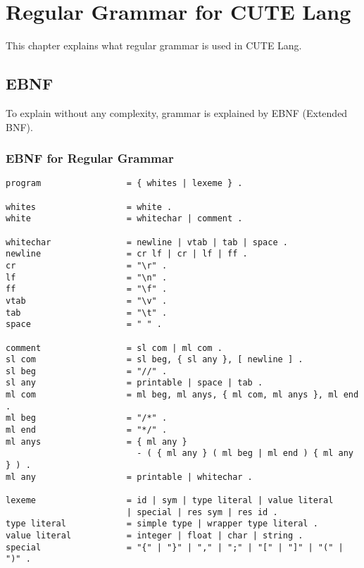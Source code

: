 \documentclass[a4paper, article, oneside, 10pt]{memoir}
\begin{document}
\pagestyle{ruled}
\chapter{Regular Grammar for CUTE Lang}
This chapter explains what regular grammar is used in CUTE Lang.

\section{EBNF}
To explain without any complexity, grammar is explained by EBNF (Extended BNF).

\subsection{EBNF for Regular Grammar}

\begin{verbatim}
program                 = { whites | lexeme } .

whites                  = white .
white                   = whitechar | comment .

whitechar               = newline | vtab | tab | space .
newline                 = cr lf | cr | lf | ff .
cr                      = "\r" .
lf                      = "\n" .
ff                      = "\f" .
vtab                    = "\v" .
tab                     = "\t" .
space                   = " " .

comment                 = sl com | ml com .
sl com                  = sl beg, { sl any }, [ newline ] .
sl beg                  = "//" .
sl any                  = printable | space | tab .
ml com                  = ml beg, ml anys, { ml com, ml anys }, ml end .
ml beg                  = "/*" .
ml end                  = "*/" .
ml anys                 = { ml any }
                          - ( { ml any } ( ml beg | ml end ) { ml any } ) .
ml any                  = printable | whitechar .

lexeme                  = id | sym | type literal | value literal
                        | special | res sym | res id .
type literal            = simple type | wrapper type literal .
value literal           = integer | float | char | string .
special                 = "{" | "}" | "," | ";" | "[" | "]" | "(" | ")" .
\end{verbatim}
\end{document}
